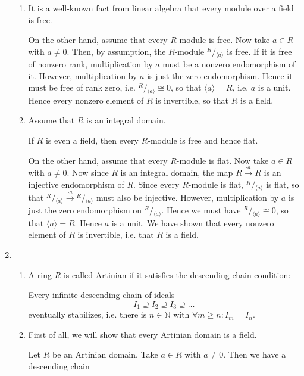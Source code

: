 \documentclass{article}
\newcommand\quotient[2]{{^{\displaystyle #1}}/{_{\displaystyle #2}}}
\begin{document}
\begin{enumerate}[style=nextline,label={Problem (\arabic*)}]
{\begin{enumerate}[label={(\alph*)}]
{\[\begin{array}{>{\displaystyle}c>{\displaystyle}l}
\cong & \mathbb{Q} \oplus 0 \\
\cong & \mathbb{Q} \\
\end{array}
\]
}
\item {
It is a well-known fact from linear algebra that every module over a field is free.
\par
On the other hand, assume that every $R$-module is free. Now take $a \in R$ with $a \neq 0$. Then, by assumption, the $R$-module $\quotient{R}{\langle a \rangle}$ is free. If it is free of nonzero rank, multiplication by $a$ must be a nonzero endomorphism of it. However, multiplication by $a$ is just the zero endomorphism. Hence it must be free of rank zero, i.e. $\quotient{R}{\langle a \rangle} \cong 0$, so that $\langle a \rangle = R$, i.e. $a$ is a unit. Hence every nonzero element of $R$ is invertible, so that $R$ is a field.
}
\item {
Assume that $R$ is an integral domain.
\par
If $R$ is even a field, then every $R$-module is free and hence flat.
\par
On the other hand, assume that every $R$-module is flat. Now take $a \in R$ with $a \neq 0$. Now since $R$ is an integral domain, the map $R \overset{\cdot a}{\to} R$ is an injective endomorphism of $R$. Since every $R$-module is flat, $\quotient{R}{\langle a \rangle}$ is flat, so that $\quotient{R}{\langle a \rangle} \overset{\cdot a}{\to} \quotient{R}{\langle a \rangle}$ must also be injective. However, multiplication by $a$ is just the zero endomorphism on $\quotient{R}{\langle a \rangle}$. Hence we must have $\quotient{R}{\langle a \rangle} \cong 0$, so that $\langle a \rangle = R$. Hence $a$ is a unit. We have shown that every nonzero element of $R$ is invertible, i.e. that $R$ is a field.
}
\end{enumerate}
}
\item {
\begin{enumerate}[label={(\alph*)}]
\item {
A ring $R$ is called Artinian if it satisfies the descending chain condition:
\par
Every infinite descending chain of ideals
\[
I_1 \supseteq I_2 \supseteq I_3 \supseteq \ldots
\]
eventually stabilizes, i.e. there is $n \in \mathbb{N}$ with $\forall m \geq n : I_m = I_n$.
}
\item {
First of all, we will show that every Artinian domain is a field.
\par
Let $R$ be an Artinian domain. Take $a \in R$ with $a \neq 0$. Then we have a descending chain
}
\end{enumerate}}
\end{enumerate}
\end{document}
